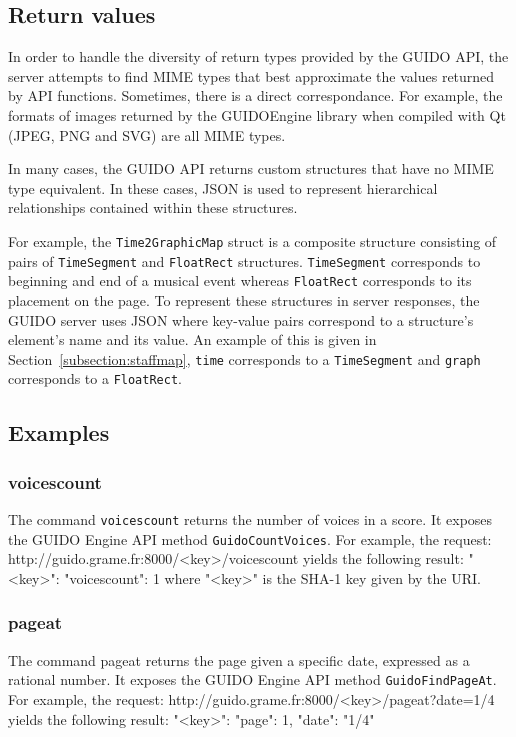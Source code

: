 \documentclass[11pt,a4paper]{article}
\newenvironment{code}		{\vspace{-2mm} \fontsize{8.5pt}{12pt}\selectfont \verbatim}{\endverbatim\vspace{-2mm}}
\newenvironment{mcode}		{\vspace{-2mm} \fontsize{10pt}{12pt}\selectfont \verbatim}{\endverbatim\vspace{-2mm}}
\begin{document}
\subsection{Return values}
In order to handle the diversity of return types provided by the GUIDO API, the server attempts to find MIME types that best approximate the values returned by API functions.  Sometimes, there is a direct correspondance.  For example, the formats of images returned by the GUIDOEngine library when compiled with Qt (JPEG, PNG and SVG) are all MIME types.\par
In many cases, the GUIDO API returns custom structures that have no MIME type equivalent.  In these cases, JSON \cite{json} is used to represent hierarchical relationships contained within these structures.\par
For example, the \verb=Time2GraphicMap= struct is a composite structure consisting of pairs of \verb=TimeSegment= and \verb=FloatRect= structures.  \verb=TimeSegment= corresponds to beginning and end of a musical event whereas \verb=FloatRect= corresponds to its placement on the page.  To represent these structures in server responses, the GUIDO server uses JSON where key-value pairs correspond to a structure's element's name and its value. An example of this is given in Section~\ref{subsection:staffmap}, \verb=time= corresponds to a \verb=TimeSegment= and \verb=graph= corresponds to a \verb=FloatRect=.
\subsection{Examples}

\subsubsection{voicescount}
The command \verb=voicescount= returns the number of voices in a score.  It exposes the GUIDO Engine API method \verb=GuidoCountVoices=.  For example, the request:
\begin{mcode}
 http://guido.grame.fr:8000/<key>/voicescount
\end{mcode}
yields the following result:
\begin{mcode}
 {
   "<key>": {
     "voicescount": 1
   }
 }
\end{mcode}
where "<key>" is the SHA-1 key given by the URI.
~

\subsubsection{pageat}
The command pageat returns the page given a specific date, expressed as a rational number.  It exposes the GUIDO Engine API method \verb=GuidoFindPageAt=.  For example, the request:
\begin{code}
 http://guido.grame.fr:8000/<key>/pageat?date=1/4
\end{code}
yields the following result:
\begin{mcode}
{
  "<key>": {
    "page": 1,
    "date": "1/4"
  }
}
\end{mcode}
\end{document}
